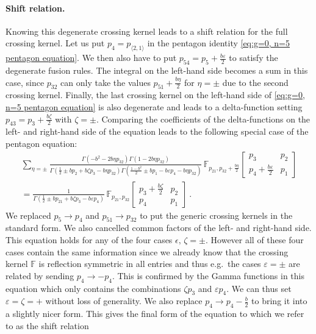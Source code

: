 \documentclass[12pt,a4paper]{article}
\begin{document}
\paragraph{Shift relation.} Knowing this degenerate crossing kernel leads to a shift relation for the full crossing kernel. Let us put $p_4=p_{\langle 2,1 \rangle}$ in the pentagon identity \eqref{eq:g=0, n=5 pentagon equation}. We then also have to put $p_{54}=p_5+\frac{b\varepsilon}{2}$ to satisfy the degenerate fusion rules. The integral on the left-hand side 
becomes a sum in this case, since $p_{32}$ can only take the values $p_{51}+\frac{b \eta}{2}$ for $\eta=\pm$ due to the second crossing kernel. Finally, the last crossing kernel on the left-hand side of \eqref{eq:g=0, n=5 pentagon equation} is also degenerate and leads to a delta-function setting $p_{43}=p_3+\frac{b \zeta}{2}$ with $\zeta=\pm$. Comparing the coefficients of the delta-functions on the left- and right-hand side of the equation leads to the following special case of the pentagon equation:
\begin{multline} 
\sum_{\eta=\pm} \frac{ \Gamma(-b^2-2b \eta p_{32})\Gamma(1-2 b \eta p_{32})}{\Gamma(\frac{1}{2}\pm b p_2+b \zeta p_3-b \eta p_{32})\Gamma(\frac{1-b^2}{2} \pm b p_1- b \varepsilon p_4-b \eta p_{32})}\, \mathbb{F}_{p_{21},p_{32}+\frac{b \eta}{2}}\!\begin{bmatrix}
    p_3 & p_2 \\
    p_4+\frac{b \varepsilon}{2} & p_1
\end{bmatrix}   \\
=\frac{1}{\Gamma(\frac{1}{2} \pm b p_{21}+ b \zeta p_3-b \varepsilon p_4)} \, \mathbb{F}_{p_{21},p_{32}} \!\begin{bmatrix}
    p_3+\frac{b \zeta}{2} & p_2 \\
    p_4 & p_1
\end{bmatrix}\ . \label{eq:shift relation epsilon zeta}
\end{multline}
We replaced $p_5 \to p_4$ and $p_{51} \to p_{32}$ to put the generic crossing kernels in the standard form.
We also cancelled common factors of the left- and right-hand side. This equation holds for any of the four cases $\epsilon,\,\zeta=\pm$. However all of these four cases contain the same information since we already know that the crossing kernel $\mathbb{F}$ is reflection symmetric in all entries and thus e.g.\ the cases $\varepsilon=\pm$ are related by sending $p_4 \to -p_4$.  This is confirmed by the Gamma functions in this equation which only contains the combinations $\zeta p_3$ and $\varepsilon p_4$. We can thus set $\varepsilon=\zeta=+$ without loss of generality. We also replace $p_4 \to p_4-\frac{b}{2}$ to bring it into a slightly nicer form. This gives the final form of the equation to which we refer to as the shift relation
\end{document}
